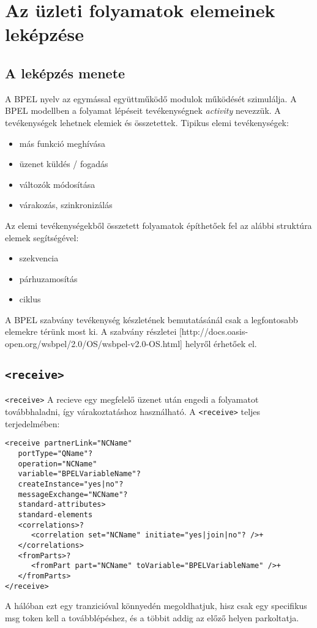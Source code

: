 \chapter{Az üzleti folyamatok elemeinek leképzése}


\section{A leképzés menete}
A BPEL nyelv az egymással együttműködő modulok működését szimulálja. A BPEL  modellben a folyamat lépéseit tevékenységnek \textsl{activity} nevezzük. A tevékenységek lehetnek elemiek és összetettek. Tipikus elemi tevékenységek:
\begin{itemize}
\item más funkció meghívása
\item üzenet küldés / fogadás
\item változók módosítása
\item várakozás, szinkronizálás
\end{itemize}
Az elemi tevékenységekből összetett folyamatok építhetőek fel az alábbi struktúra elemek segítségével:
\begin{itemize}
\item szekvencia
\item párhuzamosítás
\item ciklus
\end{itemize}

A BPEL szabvány tevékenység készletének bemutatásánál csak a legfontosabb elemekre térünk most ki. A szabvány részletei 
[http://docs.oasis-open.org/wsbpel/2.0/OS/wsbpel-v2.0-OS.html]  helyről érhetőek el. 

\section{\texttt{<receive>}}
\texttt{<receive>} A recieve egy megfelelő üzenet után engedi a folyamatot továbbhaladni, így várakoztatáshoz használható. A \texttt{<receive>} teljes terjedelmében:\\
\begin{verbatim}
<receive partnerLink="NCName"
   portType="QName"?
   operation="NCName"
   variable="BPELVariableName"?
   createInstance="yes|no"?
   messageExchange="NCName"?
   standard-attributes>
   standard-elements
   <correlations>?
      <correlation set="NCName" initiate="yes|join|no"? />+
   </correlations>
   <fromParts>?
      <fromPart part="NCName" toVariable="BPELVariableName" />+
   </fromParts>
</receive>
\end{verbatim}
A hálóban ezt egy tranzicióval könnyedén megoldhatjuk, hisz csak egy specifikus msg token kell a továbblépéshez, és a többit addig az előző helyen parkoltatja. 


